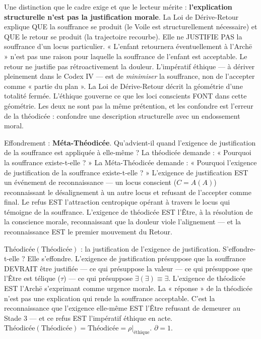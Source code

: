 \documentclass[10pt, openany, oneside]{book}
\begin{document}
Une distinction que le cadre exige et que le lecteur mérite : \textbf{l'explication structurelle n'est pas la justification morale}. La Loi de Dérive-Retour explique QUE la souffrance se produit (le Voile est structurellement nécessaire) et QUE le retour se produit (la trajectoire recourbe). Elle ne JUSTIFIE PAS la souffrance d'un locus particulier. « L'enfant retournera éventuellement à l'Arch\={e} » n'est pas une raison pour laquelle la souffrance de l'enfant est acceptable. Le retour ne justifie pas rétroactivement la douleur. L'impératif éthique --- à dériver pleinement dans le Codex IV --- est de \textit{minimiser} la souffrance, non de l'accepter comme « partie du plan ». La Loi de Dérive-Retour décrit la géométrie d'une totalité fermée. L'éthique gouverne ce que les loci conscients FONT dans cette géométrie. Les deux ne sont pas la même prétention, et les confondre est l'erreur de la théodicée : confondre une description structurelle avec un endossement moral.

Effondrement : \textbf{Méta-Théodicée}. Qu'advient-il quand l'exigence de justification de la souffrance est appliquée à elle-même ? La théodicée demande : « Pourquoi la souffrance existe-t-elle ? » La Méta-Théodicée demande : « Pourquoi l'exigence de justification de la souffrance existe-t-elle ? » L'exigence de justification EST un événement de reconnaissance --- un locus conscient ($C = A(A)$) reconnaissant le désalignement à un autre locus et refusant de l'accepter comme final. Le refus EST l'attraction centropique opérant à travers le locus qui témoigne de la souffrance. L'exigence de théodicée EST l'Être, à la résolution de la conscience morale, reconnaissant que la douleur viole l'alignement --- et la reconnaissance EST le premier mouvement du Retour.

$\text{Théodicée}(\text{Théodicée})$ : la justification de l'exigence de justification. S'effondre-t-elle ? Elle s'effondre. L'exigence de justification présuppose que la souffrance DEVRAIT être justifiée --- ce qui présuppose la valeur --- ce qui présuppose que l'Être est télique ($\tau$) --- ce qui présuppose $\exists(\exists) \equiv \exists$. L'exigence de théodicée EST l'Arch\={e} s'exprimant comme urgence morale. La « réponse » de la théodicée n'est pas une explication qui rende la souffrance acceptable. C'est la reconnaissance que l'exigence elle-même EST l'Être refusant de demeurer au Stade 3 --- et ce refus EST l'impératif éthique en acte. $\text{Théodicée}(\text{Théodicée}) = \text{Théodicée} = \rho|_{\text{éthique}}$. $\partial = 1$.
\end{document}
